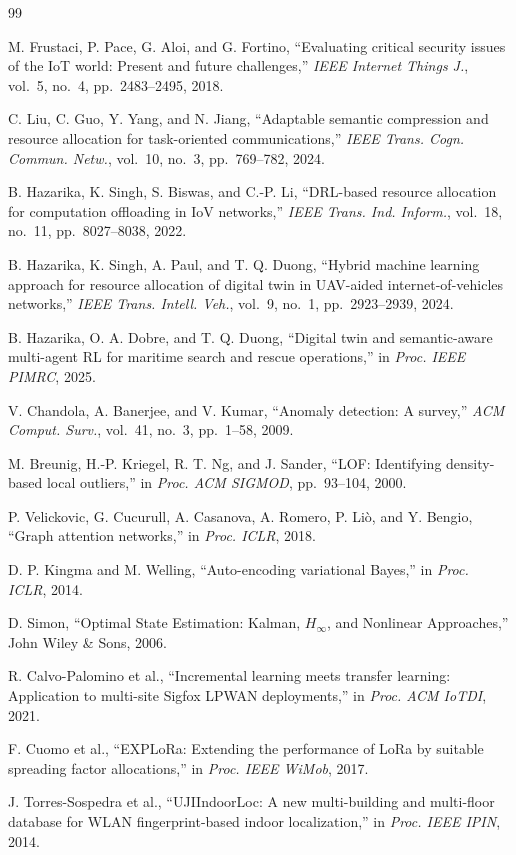\documentclass[conference]{IEEEtran}
\begin{document}
\begin{thebibliography}{99}

M. Frustaci, P. Pace, G. Aloi, and G. Fortino,
``Evaluating critical security issues of the IoT world: Present and
future challenges,''
\textit{IEEE Internet Things J.}, vol.~5, no.~4, pp.~2483--2495, 2018.

C. Liu, C. Guo, Y. Yang, and N. Jiang,
``Adaptable semantic compression and resource allocation for
task-oriented communications,''
\textit{IEEE Trans. Cogn. Commun. Netw.}, vol.~10, no.~3,
pp.~769--782, 2024.

B. Hazarika, K. Singh, S. Biswas, and C.-P. Li,
``DRL-based resource allocation for computation offloading in IoV
networks,''
\textit{IEEE Trans. Ind. Inform.}, vol.~18, no.~11,
pp.~8027--8038, 2022.

B. Hazarika, K. Singh, A. Paul, and T. Q. Duong,
``Hybrid machine learning approach for resource allocation of digital
twin in UAV-aided internet-of-vehicles networks,''
\textit{IEEE Trans. Intell. Veh.}, vol.~9, no.~1, pp.~2923--2939, 2024.

B. Hazarika, O. A. Dobre, and T. Q. Duong,
``Digital twin and semantic-aware multi-agent RL for maritime search
and rescue operations,''
in \textit{Proc. IEEE PIMRC}, 2025.

V. Chandola, A. Banerjee, and V. Kumar,
``Anomaly detection: A survey,''
\textit{ACM Comput. Surv.}, vol.~41, no.~3, pp.~1--58, 2009.

M. Breunig, H.-P. Kriegel, R. T. Ng, and J. Sander,
``LOF: Identifying density-based local outliers,''
in \textit{Proc. ACM SIGMOD}, pp.~93--104, 2000.

P. Velickovic, G. Cucurull, A. Casanova, A. Romero, P. Li\`{o},
and Y. Bengio,
``Graph attention networks,''
in \textit{Proc. ICLR}, 2018.

D. P. Kingma and M. Welling,
``Auto-encoding variational Bayes,''
in \textit{Proc. ICLR}, 2014.

D. Simon,
``Optimal State Estimation: Kalman, $H_\infty$, and Nonlinear Approaches,''
John Wiley \& Sons, 2006.

R. Calvo-Palomino et al.,
``Incremental learning meets transfer learning: Application to
multi-site Sigfox LPWAN deployments,''
in \textit{Proc. ACM IoTDI}, 2021.

F. Cuomo et al.,
``EXPLoRa: Extending the performance of LoRa by suitable spreading
factor allocations,''
in \textit{Proc. IEEE WiMob}, 2017.

J. Torres-Sospedra et al.,
``UJIIndoorLoc: A new multi-building and multi-floor database for WLAN
fingerprint-based indoor localization,''
in \textit{Proc. IEEE IPIN}, 2014.

\end{thebibliography}
\end{document}
